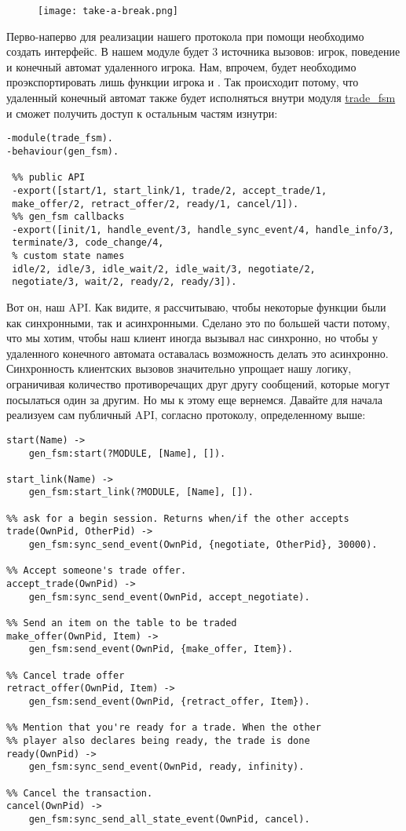 \begin{figure}[H]
    \centering
    \texttt{[image: take-a-break.png]}
\end{figure}
\label{game-trading-between-two-players}
Перво\--наперво для реализации нашего протокола при помощи  необходимо создать интерфейс.
В нашем модуле будет 3 источника вызовов: игрок, поведение  и конечный автомат удаленного игрока.
Нам, впрочем, будет необходимо проэкспортировать лишь функции игрока и .
Так происходит потому, что удаленный конечный автомат также будет исполняться внутри модуля \href{http://learnyousomeerlang.com/static/erlang/trade\_fsm.erl}{trade\_fsm} и сможет получить доступ к остальным частям изнутри:

\begin{lstlisting}[style=erlang]
-module(trade_fsm).
-behaviour(gen_fsm).
 
 %% public API
 -export([start/1, start_link/1, trade/2, accept_trade/1,
 make_offer/2, retract_offer/2, ready/1, cancel/1]).
 %% gen_fsm callbacks
 -export([init/1, handle_event/3, handle_sync_event/4, handle_info/3,
 terminate/3, code_change/4,
 % custom state names
 idle/2, idle/3, idle_wait/2, idle_wait/3, negotiate/2,
 negotiate/3, wait/2, ready/2, ready/3]).
\end{lstlisting}

Вот он, наш API.
Как видите, я рассчитываю, чтобы некоторые функции были как синхронными, так и асинхронными.
Сделано это по большей части потому, что мы хотим, чтобы наш клиент иногда вызывал нас синхронно, но чтобы у удаленного конечного автомата оставалась возможность делать это асинхронно.
Синхронность клиентских вызовов значительно упрощает нашу логику, ограничивая количество противоречащих друг другу сообщений, которые могут посылаться один за другим.
Но мы к этому еще вернемся.
Давайте для начала реализуем сам публичный API, согласно протоколу, определенному выше:
\begin{lstlisting}[style=erlang]
%%% PUBLIC API
start(Name) ->
	gen_fsm:start(?MODULE, [Name], []).
 
start_link(Name) ->
	gen_fsm:start_link(?MODULE, [Name], []).
 
%% ask for a begin session. Returns when/if the other accepts
trade(OwnPid, OtherPid) ->
	gen_fsm:sync_send_event(OwnPid, {negotiate, OtherPid}, 30000).
 
%% Accept someone's trade offer.
accept_trade(OwnPid) ->
	gen_fsm:sync_send_event(OwnPid, accept_negotiate).
 
%% Send an item on the table to be traded
make_offer(OwnPid, Item) ->
	gen_fsm:send_event(OwnPid, {make_offer, Item}).
 
%% Cancel trade offer
retract_offer(OwnPid, Item) ->
	gen_fsm:send_event(OwnPid, {retract_offer, Item}).
 
%% Mention that you're ready for a trade. When the other
%% player also declares being ready, the trade is done
ready(OwnPid) ->
	gen_fsm:sync_send_event(OwnPid, ready, infinity).
 
%% Cancel the transaction.
cancel(OwnPid) ->
	gen_fsm:sync_send_all_state_event(OwnPid, cancel).
\end{lstlisting}

